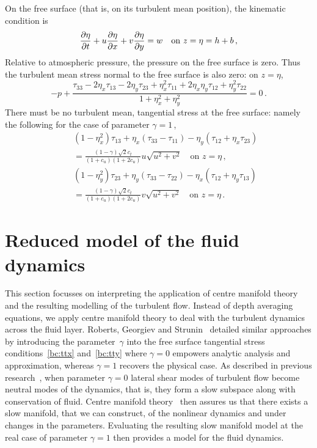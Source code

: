 \documentclass[twocolumn]{afmc_art}
\begin{document}
On the free surface (that is, on its turbulent mean position), the kinematic condition is 
\begin{equation}
 \D{t}{\eta}+u\D{x}{\eta}+v\D{y}{\eta}=w \quad\text{on } z=\eta=h+b\,,
\end{equation}
Relative to atmospheric pressure, the pressure on the free surface is zero. 
Thus the turbulent mean stress normal to the free surface is also zero: on $z=\eta$,
\begin{equation}
    -p+\frac{\tau_{33} -2\eta_x\tau_{13} -2\eta_y\tau_{23}
    +\eta_x^2\tau_{11} +2\eta_x\eta_y\tau_{12}+\eta_y^2\tau_{22}}
    {1+\eta_x^2+\eta_y^2}
     =0\,.
    \label{bc:ttz}
\end{equation}
There must be no turbulent mean, tangential stress at the free surface: namely the following for the case of parameter $\gamma=1$\,,
\begin{eqnarray}&&
    (1-\eta_x^2)\tau_{13}+\eta_x(\tau_{33}-\tau_{11})
    -\eta_y(\tau_{12}+\eta_x\tau_{23})
    \nonumber\\&&{}
    = \frac{(1-\gamma)\sqrt2c_t}{(1+c_u)(1+2c_u)} u\sqrt{u^2+v^2}
    \quad\text{on } z=\eta\,,
    \label{bc:ttx}
    \\&&
    (1-\eta_y^2)\tau_{23}+\eta_y(\tau_{33}-\tau_{22})
    -\eta_x(\tau_{12}+\eta_y\tau_{13})
    \nonumber\\&&{}
    = \frac{(1-\gamma)\sqrt2c_t}{(1+c_u)(1+2c_u)} v\sqrt{u^2+v^2}
    \quad\text{on } z=\eta\,.
    \label{bc:tty}
\end{eqnarray}


\section{Reduced model of the fluid dynamics}

This section focusses on interpreting the application of centre manifold theory and the resulting modelling of the turbulent flow.
Instead of depth averaging equations, we apply centre manifold theory to deal with the turbulent dynamics across the fluid layer. 
Roberts, Georgiev and Strunin~\cite{Roberts2008, Georgiev2008} detailed similar approaches by introducing the parameter~$\gamma$ into the free surface tangential stress conditions~\eqref{bc:ttx} and~\eqref{bc:tty} where $\gamma=0$ empowers analytic analysis and approximation, whereas $\gamma=1$ recovers the physical case. 
As described in previous research~\cite{Roberts2008, Georgiev2008}, when parameter \(\gamma=0\) lateral shear modes of turbulent flow become neutral modes of the dynamics, that is, they form a slow subspace along with conservation of fluid.
Centre manifold theory~\cite[e.g.]{Vanderbauwhede88} then assures us that there exists a slow manifold, that we can construct, of the nonlinear dynamics and under changes in the parameters.
Evaluating the resulting slow manifold model at the real case of parameter \(\gamma=1\) then provides a model for the fluid dynamics.
 
\end{document}
